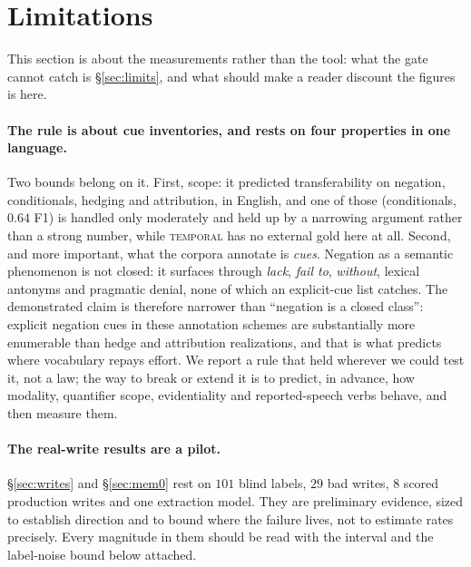 \documentclass[11pt]{article}
\begin{document}
\section*{Limitations}

This section is about the measurements rather than the tool: what the gate cannot catch
is \S\ref{sec:limits}, and what should make a reader discount the figures is here.

\paragraph{The rule is about cue inventories, and rests on four properties in one
language.} Two bounds belong on it. First, scope: it predicted transferability on
negation, conditionals, hedging and attribution, in English, and one of those
(conditionals, $0.64$ F1) is handled only moderately and held up by a narrowing argument
rather than a strong number, while \textsc{temporal} has no external gold here at all.
Second, and more important, what the corpora annotate is \emph{cues}. Negation as a
semantic phenomenon is not closed: it surfaces through \emph{lack}, \emph{fail to},
\emph{without}, lexical antonyms and pragmatic denial, none of which an explicit-cue list
catches. The demonstrated claim is therefore narrower than ``negation is a closed
class'': explicit negation cues in these annotation schemes are substantially more
enumerable than hedge and attribution realizations, and that is what predicts where
vocabulary repays effort. We report a rule that held wherever we could test it, not a
law; the way to break or extend it is to predict, in advance, how modality, quantifier
scope, evidentiality and reported-speech verbs behave, and then measure them.

\paragraph{The real-write results are a pilot.} \S\ref{sec:writes} and \S\ref{sec:mem0}
rest on $101$ blind labels, $29$ bad writes, $8$ scored production writes and one
extraction model. They are preliminary evidence, sized to establish direction and to
bound where the failure lives, not to estimate rates precisely. Every magnitude in them
should be read with the interval and the label-noise bound below attached.
\end{document}
